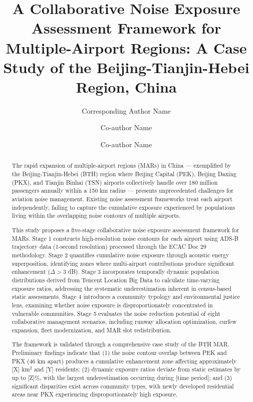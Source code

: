 \documentclass[review,12pt]{elsarticle}
\begin{document}
\begin{frontmatter}

\title{A Collaborative Noise Exposure Assessment Framework for Multiple-Airport Regions: A Case Study of the Beijing-Tianjin-Hebei Region, China}

\author[1]{Corresponding Author Name}
\author[2]{Co-author Name}
\author[1]{Co-author Name}

\address[1]{Department/Affiliation 1, City, Country}
\address[2]{Department/Affiliation 2, City, Country}

\begin{abstract}
The rapid expansion of multiple-airport regions (MARs) in China --- exemplified by the Beijing-Tianjin-Hebei (BTH) region where Beijing Capital (PEK), Beijing Daxing (PKX), and Tianjin Binhai (TSN) airports collectively handle over 180 million passengers annually within a 150 km radius --- presents unprecedented challenges for aviation noise management. Existing noise assessment frameworks treat each airport independently, failing to capture the cumulative exposure experienced by populations living within the overlapping noise contours of multiple airports.

This study proposes a five-stage collaborative noise exposure assessment framework for MARs. Stage 1 constructs high-resolution noise contours for each airport using ADS-B trajectory data (1-second resolution) processed through the ECAC Doc 29 methodology. Stage 2 quantifies cumulative noise exposure through acoustic energy superposition, identifying zones where multi-airport contributions produce significant enhancement ($\Delta > 3$ dB). Stage 3 incorporates temporally dynamic population distributions derived from Tencent Location Big Data to calculate time-varying exposure ratios, addressing the systematic underestimation inherent in census-based static assessments. Stage 4 introduces a community typology and environmental justice lens, examining whether noise exposure is disproportionately concentrated in vulnerable communities. Stage 5 evaluates the noise reduction potential of eight collaborative management scenarios, including runway allocation optimization, curfew expansion, fleet modernization, and MAR slot redistribution.

The framework is validated through a comprehensive case study of the BTH MAR. Preliminary findings indicate that (1) the noise contour overlap between PEK and PKX (46 km apart) produces a cumulative enhancement zone affecting approximately [X] km$^2$ and [Y] residents; (2) dynamic exposure ratios deviate from static estimates by up to [Z]\%, with the largest underestimation occurring during [time period]; and (3) significant disparities exist across community types, with newly developed residential areas near PKX experiencing disproportionately high exposure.


\end{abstract}
\end{frontmatter}
\end{document}
